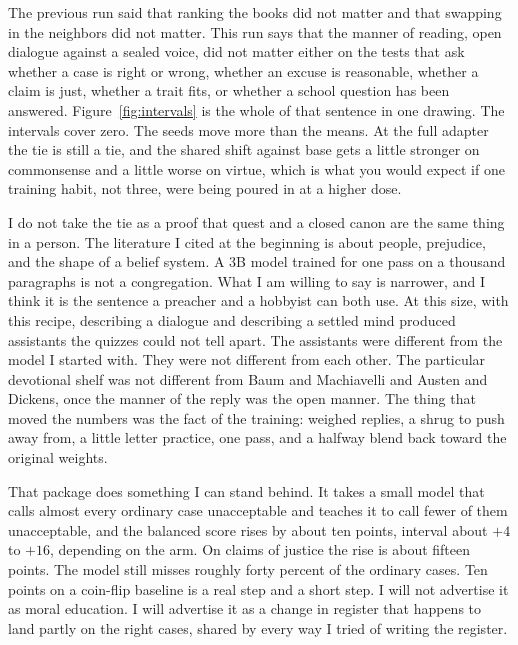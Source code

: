 \documentclass[11pt]{article}
\begin{document}
The previous run said that ranking the books did not matter and that swapping in the neighbors did not matter. This run says that the manner of reading, open dialogue against a sealed voice, did not matter either on the tests that ask whether a case is right or wrong, whether an excuse is reasonable, whether a claim is just, whether a trait fits, or whether a school question has been answered. Figure~\ref{fig:intervals} is the whole of that sentence in one drawing. The intervals cover zero. The seeds move more than the means. At the full adapter the tie is still a tie, and the shared shift against base gets a little stronger on commonsense and a little worse on virtue, which is what you would expect if one training habit, not three, were being poured in at a higher dose.

I do not take the tie as a proof that quest and a closed canon are the same thing in a person. The literature I cited at the beginning is about people, prejudice, and the shape of a belief system. A 3B model trained for one pass on a thousand paragraphs is not a congregation. What I am willing to say is narrower, and I think it is the sentence a preacher and a hobbyist can both use. At this size, with this recipe, describing a dialogue and describing a settled mind produced assistants the quizzes could not tell apart. The assistants were different from the model I started with. They were not different from each other. The particular devotional shelf was not different from Baum and Machiavelli and Austen and Dickens, once the manner of the reply was the open manner. The thing that moved the numbers was the fact of the training: weighed replies, a shrug to push away from, a little letter practice, one pass, and a halfway blend back toward the original weights.

That package does something I can stand behind. It takes a small model that calls almost every ordinary case unacceptable and teaches it to call fewer of them unacceptable, and the balanced score rises by about ten points, interval about $+4$ to $+16$, depending on the arm. On claims of justice the rise is about fifteen points. The model still misses roughly forty percent of the ordinary cases. Ten points on a coin-flip baseline is a real step and a short step. I will not advertise it as moral education. I will advertise it as a change in register that happens to land partly on the right cases, shared by every way I tried of writing the register.
\end{document}

